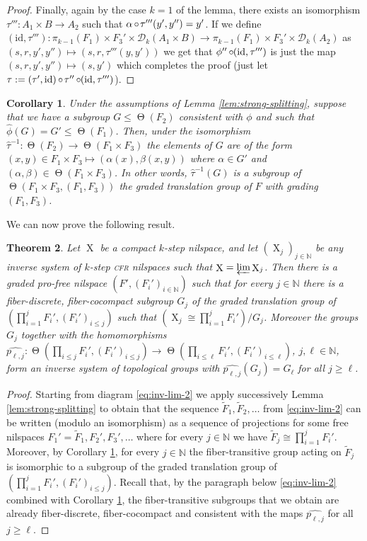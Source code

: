 \documentclass[a4paper,12pt,reqno]{amsart}
\newtheorem{theorem}{Theorem}[section]
\newtheorem{corollary}[theorem]{Corollary}
\theoremstyle{definition}
\def\to{\rightarrow}
\newcommand{\mc}{\mathcal}
\newcommand{\mb}{\mathbb}
\newcommand{\id}{\mathrm{id}}
\DeclareMathOperator{\tran}{\Theta}
\DeclareMathOperator{\ns}{X}
\DeclareMathOperator{\co}{\circ\hspace{-0.02 cm}}
\begin{document}
\begin{proof}
Finally, again by the case $k=1$ of the lemma, there exists an isomorphism $\tau''':A_1\times B\to A_2$ such that $\alpha \co \tau'''(y',y'')=y'$. If we define $(\id,\tau'''):\pi_{k-1}(F_1)\times  F_3' \times \mc{D}_k(A_1\times B)\to \pi_{k-1}(F_1)\times  F_3' \times \mc{D}_k(A_2)$ as $(s,r,y',y'')\mapsto (s,r,\tau'''(y,y'))$ we get that $\phi''\co (\id,\tau''')$ is just the map $(s,r,y',y'')\mapsto (s,y')$ which completes the proof (just let $\tau:=(\tau',\id)\co \tau''\co(\id,\tau''')$).\end{proof}

\begin{corollary}\label{cor:trans-in-graded-trans-group}
Under the assumptions of Lemma \ref{lem:strong-splitting}, suppose that we have a subgroup $G\le \tran(F_2)$ consistent with $\phi$ and such that $\widehat{\phi}(G)=G'\le \tran(F_1)$. Then, under the isomorphism $\widehat{\tau}^{-1}:\tran(F_2)\to\tran(F_1\times F_3) $ the elements of $G$ are of the form $(x,y)\in F_1\times F_3\mapsto (\alpha(x),\beta(x,y))$ where $\alpha\in G'$ and $(\alpha,\beta)\in \tran(F_1\times F_3)$. In other words, $\widehat{\tau}^{-1}(G)$ is a subgroup of $\tran(F_1\times F_3,(F_1,F_3))$ the graded translation group of $F$ with grading $(F_1,F_3)$.
\end{corollary}
We can now prove the following result.
\begin{theorem}\label{thm:covering-of-inverse limit}
Let $\ns$ be a compact $k$-step nilspace, and let $(\ns_j)_{j\in\mb{N}}$ be any inverse system of $k$-step \textsc{cfr} nilspaces such that $\ns=\varprojlim \ns_j$. Then there is a graded pro-free nilspace $(F',(F_i')_{i\in\mb{N}})$ such that for every $j\in \mb{N}$ there is a fiber-discrete, fiber-cocompact  subgroup $G_j$ of the graded translation group of $(\prod_{i=1}^j F_i',(F_i')_{i\le j})$ such that $(\ns_j\cong \prod_{i=1}^j F_i')/G_j$. Moreover the groups $G_j$ together with the homomorphisms $\widehat{p_{\ell,j}}:\tran(\prod_{i\le j} F_i',(F_i')_{i\le j})\to \tran(\prod_{i\le \ell} F_i',(F_i')_{i\le \ell})$,  $j,\ell\in \mb{N}$, form an inverse system of topological groups with $\widehat{p_{\ell,j}}(G_j)=G_\ell$ for all $j\ge \ell$.
\end{theorem}

\begin{proof}
Starting from diagram \eqref{eq:inv-lim-2} we apply successively Lemma \ref{lem:strong-splitting} to obtain that the sequence $\tilde F_1,\tilde F_2,\ldots$ from \eqref{eq:inv-lim-2} can be written (modulo an isomorphism) as a sequence of projections for some free nilspaces $F_1'=\tilde F_1, F_2',F_3',\ldots$ where for every $j\in \mb{N}$ we have $\tilde F_j\cong \prod_{i=1}^j F_i'$. Moreover, by Corollary \ref{cor:trans-in-graded-trans-group}, for every $j\in \mb{N}$ the fiber-transitive group acting on  $\tilde F_j$ is isomorphic to a subgroup of the graded translation group of $(\prod_{i=1}^j F_i',(F_i')_{i\le j})$. Recall that, by the paragraph below \eqref{eq:inv-lim-2} combined with Corollary \ref{cor:trans-in-graded-trans-group}, the fiber-transitive subgroups that we obtain are already fiber-discrete, fiber-cocompact and consistent with the maps $\widehat{p_{\ell,j}}$ for all $j\ge \ell$.
\end{proof}
\end{document}
